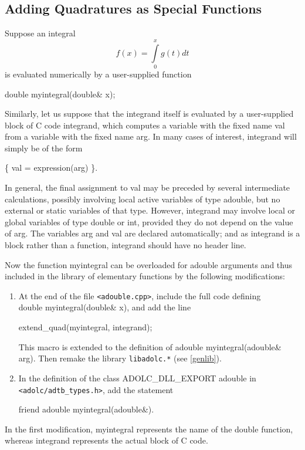 \documentclass[11pt,twoside]{article}
\begin{document}
\subsection{Adding Quadratures as Special Functions}
%
\label{quadrat}
%
Suppose an integral 
\[ f(x) = \int\limits^{x}_{0} g(t) dt \]
is evaluated numerically by a user-supplied function 
\begin{center}
{\sf  double  myintegral(double\& x);}
\end{center}
Similarly, let us suppose that the integrand itself is evaluated by
a user-supplied block of C code {\sf integrand}, which computes a
variable with the fixed name {\sf val} from a variable with the fixed
name {\sf arg}. In many cases of interest, {\sf integrand} will
simply be of the form
\begin{center}
{\sf \{ val = expression(arg) \}}\enspace .
\end{center}
In general, the final assignment to {\sf val} may be preceded
by several intermediate calculations, possibly involving local 
active variables of type {\sf adouble}, but no external or static
variables of that type.  However, {\sf integrand} may involve local
or global variables of type {\sf double} or {\sf int}, provided they
do not depend on the value of {\sf arg}. The variables {\sf arg} and 
{\sf val} are declared automatically; and as {\sf integrand} is a block
rather than a function, {\sf integrand} should have no header line.  

Now the function {\sf myintegral} can be overloaded for {\sf adouble}
arguments and thus included in the library of elementary functions 
by the following modifications:
\begin{enumerate}
\item
At the end of the file \verb=<adouble.cpp>=, include the full code
defining \\ {\sf double myintegral(double\& x)}, and add the line
\begin{center}
{\sf extend\_quad(myintegral, integrand); }
\end{center}
This macro is extended to the definition of 
 {\sf adouble myintegral(adouble\& arg)}.
Then remake the library \verb=libadolc.*= (see \autoref{genlib}). 
\item
In the definition of the class
{\sf ADOLC\_DLL\_EXPORT adouble} in \verb=<adolc/adtb_types.h>=, add the statement
\begin{center}
{\sf friend adouble myintegral(adouble\&)}.
\end{center}
\end{enumerate}
In the first modification, {\sf myintegral} represents the name of the
{\sf double} function, whereas {\sf integrand} represents the actual block
of C code. 
\end{document}
